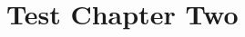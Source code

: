 \documentclass{book}
\begin{document}
\chapter{Test Chapter Two}
\cite{Fow75}
\pagebreak
\renewcommand\bibname{{REFERENCES}} %

\end{document}
